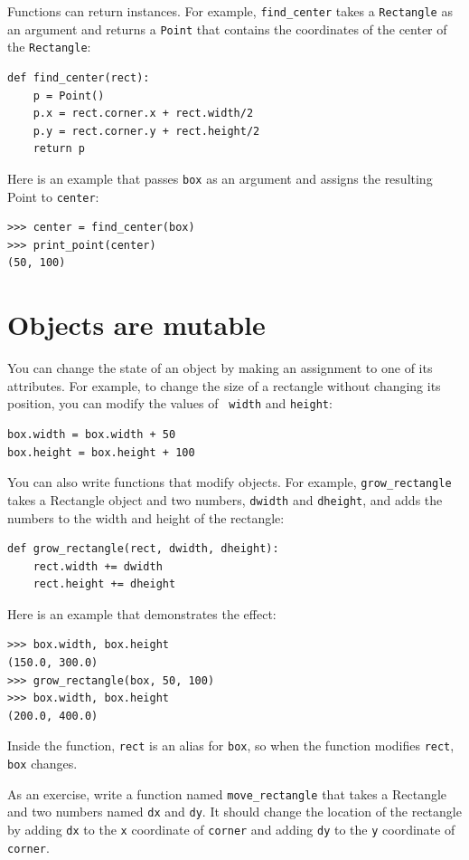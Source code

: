 \documentclass[10pt]{book}
\begin{document}
Functions can return instances.  For example, \verb"find_center"
takes a {\tt Rectangle} as an argument and returns a {\tt Point}
that contains the coordinates of the center of the {\tt Rectangle}:

\begin{verbatim}
def find_center(rect):
    p = Point()
    p.x = rect.corner.x + rect.width/2
    p.y = rect.corner.y + rect.height/2
    return p
\end{verbatim}
%
Here is an example that passes {\tt box} as an argument and assigns
the resulting Point to {\tt center}:

\begin{verbatim}
>>> center = find_center(box)
>>> print_point(center)
(50, 100)
\end{verbatim}
%

\section{Objects are mutable}

You can change the state of an object by making an assignment to one of
its attributes.  For example, to change the size of a rectangle
without changing its position, you can modify the values of {\tt
width} and {\tt height}:

\begin{verbatim}
box.width = box.width + 50
box.height = box.height + 100
\end{verbatim}
%
You can also write functions that modify objects.  For example,
\verb"grow_rectangle" takes a Rectangle object and two numbers,
{\tt dwidth} and {\tt dheight}, and adds the numbers to the
width and height of the rectangle:

\begin{verbatim}
def grow_rectangle(rect, dwidth, dheight):
    rect.width += dwidth
    rect.height += dheight
\end{verbatim}
%
Here is an example that demonstrates the effect:

\begin{verbatim}
>>> box.width, box.height
(150.0, 300.0)
>>> grow_rectangle(box, 50, 100)
>>> box.width, box.height
(200.0, 400.0)
\end{verbatim}
%
Inside the function, {\tt rect} is an
alias for {\tt box}, so when the function modifies {\tt rect},
{\tt box} changes.

As an exercise, write a function named \verb"move_rectangle" that takes
a Rectangle and two numbers named {\tt dx} and {\tt dy}.  It
should change the location of the rectangle by adding {\tt dx}
to the {\tt x} coordinate of {\tt corner} and adding {\tt dy}
to the {\tt y} coordinate of {\tt corner}.
\end{document}
